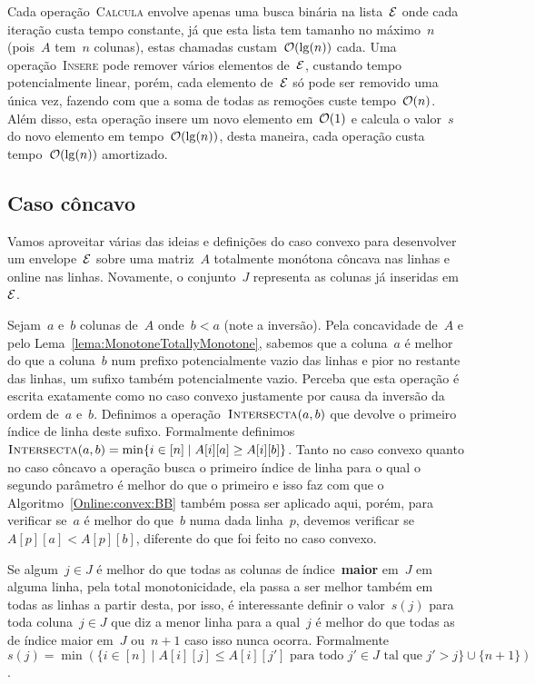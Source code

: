 Cada operação~\textsc{Calcula} envolve apenas uma busca binária na lista~$\mathcal{E}$ onde cada iteração custa tempo constante, já que esta lista tem tamanho no máximo~$n$ (pois~$A$ tem~$n$ colunas), estas chamadas custam~$\mathcal{O}(\lg(n))$ cada. Uma operação~\textsc{Insere} pode remover vários elementos de~$\mathcal{E}$, custando tempo potencialmente linear, porém, cada elemento de~$\mathcal{E}$ só pode ser removido uma única vez, fazendo com que a soma de todas as remoções custe tempo~$\mathcal{O}(n)$. Além disso, esta operação insere um novo elemento em~$\mathcal{O}(1)$ e calcula o valor~$s$ do novo elemento em tempo~$\mathcal{O}(\lg(n))$, desta maneira, cada operação custa tempo~$\mathcal{O}(\lg(n))$ amortizado.


\subsection{Caso côncavo} \label{Online:concave}

Vamos aproveitar várias das ideias e definições do caso convexo para desenvolver um envelope~$\mathcal{E}$ sobre uma matriz~$A$ totalmente monótona côncava nas linhas e online nas linhas. Novamente, o conjunto~$J$ representa as colunas já inseridas em~$\mathcal{E}$.

Sejam~$a$ e~$b$ colunas de~$A$ onde~$b < a$ (note a inversão). Pela concavidade de~$A$ e pelo Lema~\ref{lema:MonotoneTotallyMonotone}, sabemos que a coluna~$a$ é melhor do que a coluna~$b$ num prefixo potencialmente vazio das linhas e pior no restante das linhas, um sufixo também potencialmente vazio. Perceba que esta operação é escrita exatamente como no caso convexo justamente por causa da inversão da ordem de~$a$ e~$b$. Definimos a operação~$\textsc{Intersecta}(a,b)$ que devolve o primeiro índice de linha deste sufixo. Formalmente definimos~$\textsc{Intersecta}(a,b) = \min\{i \in [n] \mid A[i][a] \geq A[i][b]\}$. Tanto no caso convexo quanto no caso côncavo a operação busca o primeiro índice de linha para o qual o segundo parâmetro é melhor do que o primeiro e isso faz com que o Algoritmo~\ref{Online:convex:BB} também possa ser aplicado aqui, porém, para verificar se~$a$ é melhor do que~$b$ numa dada linha~$p$, devemos verificar se~${ A[p][a] < A[p][b] }$, diferente do que foi feito no caso convexo.

Se algum~$j \in J$ é melhor do que todas as colunas de índice~\textbf{maior} em~$J$ em alguma linha, pela total monotonicidade, ela passa a ser melhor também em todas as linhas a partir desta, por isso, é interessante definir o valor~$s(j)$ para toda coluna~$j \in J$ que diz a menor linha para a qual~$j$ é melhor do que todas as de índice maior em~$J$ ou~$n+1$ caso isso nunca ocorra. Formalmente~${ s(j) = \min(\{i \in [n] \mid A[i][j] \leq A[i][j'] \text{ para todo } j' \in J \text{ tal que } j' > j\} \cup \{n+1\}) }$.

